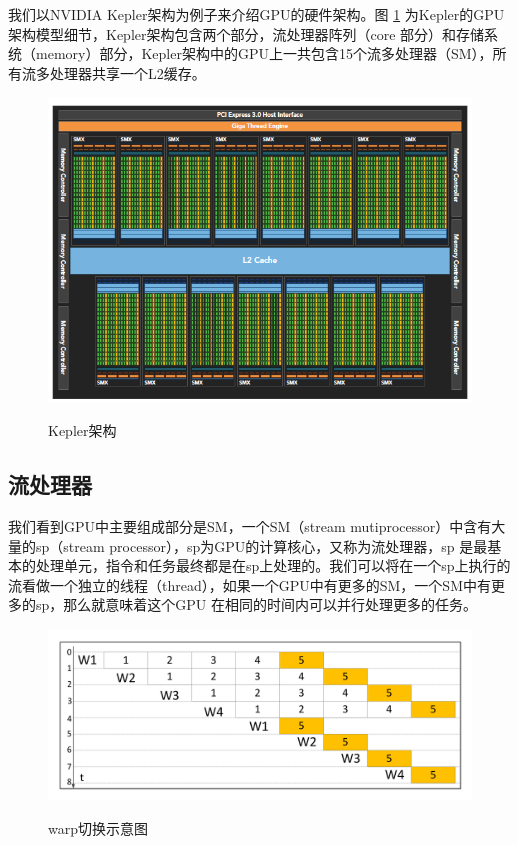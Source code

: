我们以NVIDIA Kepler架构为例子来介绍GPU的硬件架构。图 \ref{KPA} 为Kepler的GPU架构模型细节，Kepler架构包含两个部分，流处理器阵列（core 部分）和存储系统（memory）部分，Kepler架构中的GPU上一共包含15个流多处理器（SM），所有流多处理器共享一个L2缓存。
\begin{figure}
\setlength{\abovecaptionskip}{-0.5cm}
\begin{center}
{\includegraphics[width=1 \textwidth]{figures/arc.png}}
\end{center}
\caption{{\footnotesize{Kepler架构}}}
\label{KPA}
\end{figure}
\subsection {流处理器}
我们看到GPU中主要组成部分是SM，一个SM（stream mutiprocessor）中含有大量的sp（stream processor），sp为GPU的计算核心，又称为流处理器，sp 是最基本的处理单元，指令和任务最终都是在sp上处理的。我们可以将在一个sp上执行的流看做一个独立的线程（thread），如果一个GPU中有更多的SM，一个SM中有更多的sp，那么就意味着这个GPU 在相同的时间内可以并行处理更多的任务。
\begin{figure}
\setlength{\abovecaptionskip}{-0.5cm}
\begin{center}
{\includegraphics[width=0.8 \textwidth]{figures/warpsketch.pdf}}
\end{center}
\caption{{\footnotesize{warp切换示意图}}}
\label{wps}
\end{figure}
